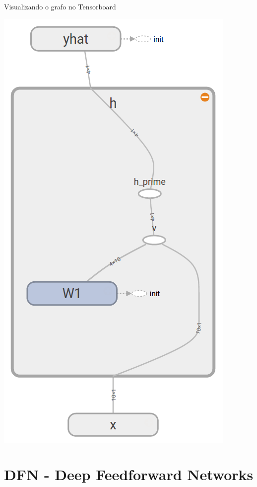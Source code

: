 \documentclass[10pt]{beamer}
\begin{document}
\begin{frame}[fragile]{Visualizando o grafo no Tensorboard}
\begin{center}
\includegraphics[scale=0.26]{images/abstract_tf_graph2.png}
\end{center}
\end{frame}


\section{DFN - Deep Feedforward Networks}
\end{document}
